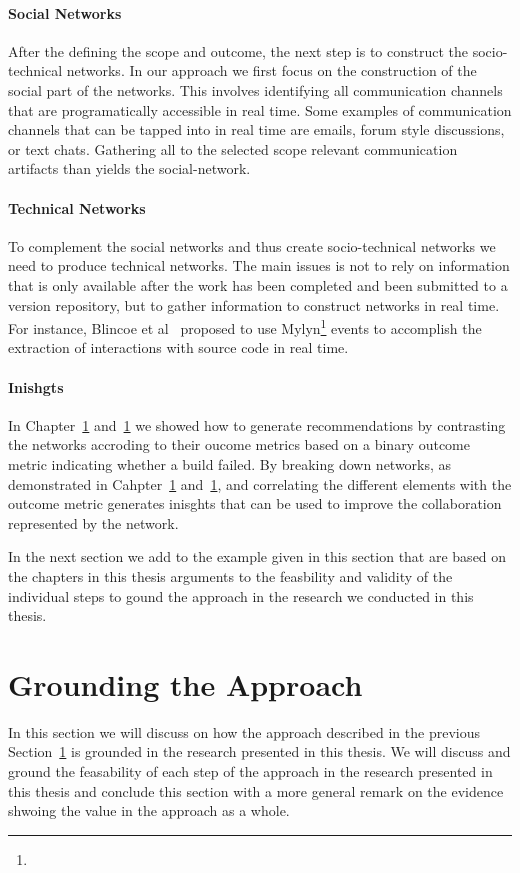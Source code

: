 \paragraph{Social Networks}
After the defining the scope and outcome, the next step is to construct the socio-technical networks.
In our approach we first focus on the construction of the social part of the networks.
This involves identifying all communication channels that are programatically accessible in real time.
Some examples of communication channels that can be tapped into in real time are emails, forum style discussions, or text chats.
Gathering all to the selected scope relevant communication artifacts than yields the social-network.

\paragraph{Technical Networks}
To complement the social networks and thus create socio-technical networks we need to produce technical networks.
The main issues is not to rely on information that is only available after the work has been completed and been submitted to a version repository, but to gather information to construct networks in real time.
For instance, Blincoe et al~\cite{} proposed to use Mylyn\footnote{} events to accomplish the extraction of interactions with source code in real time.

\paragraph{Inishgts}
In Chapter~\ref{} and~\ref{} we showed how to generate recommendations by contrasting the networks accroding to their oucome metrics based on a binary outcome metric indicating whether a build failed.
By breaking down networks, as demonstrated in Cahpter~\ref{} and~\ref{}, and correlating the different elements with the outcome metric generates inisghts that can be used to improve the collaboration represented by the network.

In the next section we add to the example given in this section that are based on the chapters in this thesis arguments to the feasbility and validity of the individual steps to gound the approach in the research we conducted in this thesis.

\section{Grounding the Approach}
In this section we will discuss on how the approach described in the previous Section~\ref{} is grounded in the research presented in this thesis.
We will discuss and ground the feasability of each step of the approach in the research presented in this thesis and conclude this section with a more general remark on the evidence shwoing the value in the approach as a whole.

